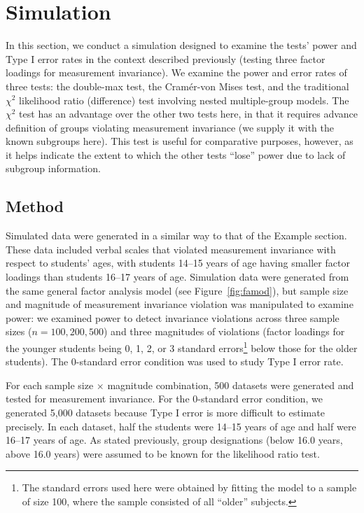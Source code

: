 \documentclass[man]{apa}
\begin{document}
\section{Simulation}
In this section, we conduct a simulation designed to
examine the tests' power and Type I error rates in the context
described previously (testing three factor loadings for measurement
invariance).  We 
examine the power and error rates of three tests: the double-max test, the
Cram\'{e}r-von Mises test, and the traditional $\chi^2$ likelihood
ratio (difference) test involving nested 
multiple-group models.  The $\chi^2$ test has an advantage over the
other two tests here, in that it requires advance definition of
groups violating measurement invariance (we supply it with the known
subgroups here).  This test is useful for comparative purposes,
however, as it helps indicate the extent to which the other tests
``lose'' power due to lack of subgroup information.

\subsection{Method}
Simulated data were generated in a similar way to that of 
the Example section.
These data included verbal scales that violated measurement invariance
with respect to students' ages, with students 14--15 years of age
having smaller factor loadings than students 16--17 years of age.  
Simulation data were generated from the same general factor analysis
model (see Figure~\ref{fig:famod}), but sample size and magnitude
of measurement 
invariance violation was manipulated to examine power:
we examined power to detect 
invariance violations across three sample sizes ($n=100,
200, 500$) and three magnitudes of violations (factor loadings
for the younger students being 0, 1, 2, or 3 standard
errors\footnote{The standard errors used here were
  obtained by fitting
  the model to a sample of size 100, where the sample consisted of all
  ``older'' subjects.} below 
those for the older students).  The 0-standard error condition was
used to study Type I error rate.

For each sample size $\times$
magnitude combination, 500 datasets were generated and tested for
measurement invariance.  For the 0-standard error condition, we
generated 5,000 datasets because Type I
error is more difficult to estimate precisely.  In each dataset, half the
students were 14--15 
years of age and half were 16--17 years of age.  As stated previously,
group
designations (below 16.0 years, above 16.0 years) were assumed to be
known for the likelihood ratio test.
\end{document}
